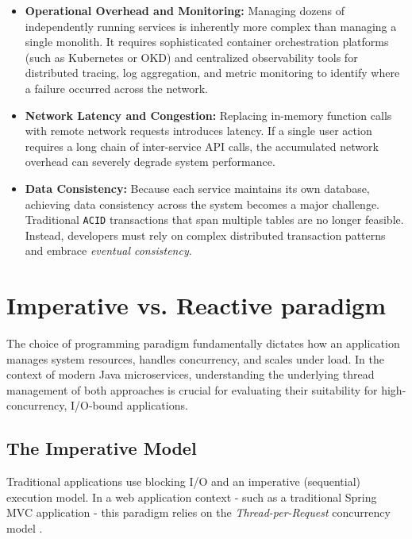 \begin{itemize}
    \item \textbf{Operational Overhead and Monitoring:} Managing dozens of independently running services is inherently more complex than managing a single monolith. It requires sophisticated container orchestration platforms (such as Kubernetes or OKD) and centralized observability tools for distributed tracing, log aggregation, and metric monitoring to identify where a failure occurred across the network.
    \item \textbf{Network Latency and Congestion:} Replacing in-memory function calls with remote network requests introduces latency. If a single user action requires a long chain of inter-service API calls, the accumulated network overhead can severely degrade system performance.
    \item \textbf{Data Consistency:} Because each service maintains its own database, achieving data consistency across the system becomes a major challenge. Traditional \texttt{\gls{ACID}} transactions that span multiple tables are no longer feasible. Instead, developers must rely on complex distributed transaction patterns and embrace \textit{eventual consistency}.
\end{itemize}


\section{Imperative vs. Reactive paradigm}
\label{sec:programming_paradigms}

The choice of programming paradigm fundamentally dictates how an application manages system resources, handles concurrency, and scales under load. In the context of modern Java microservices, understanding the underlying thread management of both approaches is crucial for evaluating their suitability for high-concurrency, I/O-bound applications.

\subsection{The Imperative Model}

Traditional applications use blocking I/O and an imperative (sequential) execution model. In a web application context - such as a traditional Spring MVC application - this paradigm relies on the \textit{Thread-per-Request} concurrency model \cite{devglan_reactive}.

